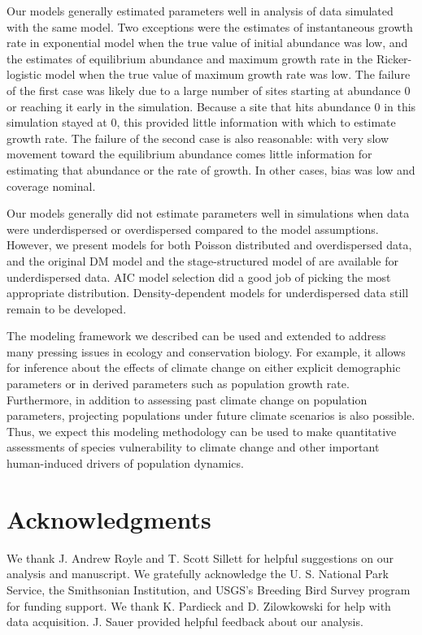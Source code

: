 \documentclass[12pt,english]{article}
\begin{document}
\begin{spacing}{1.9}
\begin{flushleft}
Our models generally estimated parameters well in analysis of data simulated with the same model.
Two exceptions were the estimates of instantaneous growth rate in exponential model when the 
true value of initial abundance was low, and the estimates of equilibrium abundance and maximum
growth rate in the Ricker-logistic model when the true value of maximum growth rate was low.  
The failure of the first case was likely due to a large number of sites starting at abundance 0 or reaching it early in the simulation.  
Because a site that hits abundance 0 in this simulation stayed at 0, this provided little information with
which to estimate growth rate.  The failure of the second case is also reasonable: with very
slow movement toward the equilibrium abundance comes little information for estimating
that abundance or the rate of growth.  In other cases, bias was low and coverage nominal.

Our models generally did not estimate parameters well in simulations when data were underdispersed
or overdispersed compared to the model assumptions.  However, we present models for
both Poisson distributed and overdispersed data, and the original DM model and the 
stage-structured model of \citet{zipkin_etal:2014} are available for underdispersed data.  AIC model
selection did a good job of picking the most appropriate distribution.  Density-dependent models
for underdispersed data still remain to be developed.

The modeling framework we described can be used and extended to address many
pressing issues in ecology and conservation biology. For
example,
it allows for inference 
about the effects of climate change on either explicit
demographic parameters or in derived parameters such as
population growth rate. Furthermore, 
in addition to assessing past climate change on population
parameters, projecting populations under future climate scenarios is also
possible. Thus, we expect this modeling methodology can be used
to make quantitative assessments of species vulnerability to climate
change and other important human-induced drivers of population
dynamics.


\section*{Acknowledgments}

We thank J. Andrew Royle and T. Scott Sillett for helpful suggestions on our analysis
and manuscript. We gratefully acknowledge the U. S. National Park 
Service, the Smithsonian Institution, and USGS's Breeding Bird Survey program for funding support.
We thank K. Pardieck and D. Zilowkowski for help with data acquisition. J. Sauer 
provided helpful feedback about our analysis.


\end{flushleft}
\end{spacing}
\end{document}
